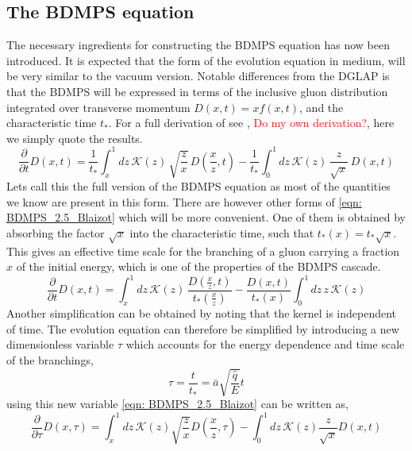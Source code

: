 \documentclass[main.tex]{subfiles}
\begin{document}
\subsection{The BDMPS equation}\label{sec: BDMPS_theory}
The necessary ingredients for constructing the BDMPS equation has now been introduced. It is expected that the form of the evolution equation in medium, will be very similar to the vacuum version. Notable differences from the DGLAP is that the BDMPS will be expressed in terms of the inclusive gluon distribution integrated over transverse momentum \(D(x,t) = x f(x,t)\), and the characteristic time \(t_*\). For a full derivation of see \cite{Probabilistic_picture_for_medium-induced_jet_evolution}, \textcolor{red}{Do my own derivation?}, here we simply quote the results. 
\begin{equation}\label{eqn: BDMPS_2.5_Blaizot}
    \frac{\partial}{\partial t} D(x,t) = \frac{1}{t_*} \int_x^1 dz\, \mathcal{K}(z)\, \sqrt{\frac{z}{x}}\, D\left(\frac{x}{z}, t\right) -\frac{1}{t_*} \int_0^1 dz\, \mathcal{K}(z)\, \frac{z}{\sqrt{x}}\, D\left(x,t\right)
\end{equation}
Lets call this the full version of the BDMPS equation as most of the quantities we know are present in this form. 
There are however other forms of \autoref{eqn: BDMPS_2.5_Blaizot} which will be more convenient. One of them is obtained by absorbing the factor \(\sqrt{x}\) into the characteristic time, such that \(t_*(x) = t_* \sqrt{x}\). This gives an effective time scale for the branching of a gluon carrying a fraction \(x\) of the initial energy, which is one of the properties of the BDMPS cascade.
\begin{equation}\label{eqn: BDMPS_2.8_Blaizot}
    \frac{\partial}{\partial t} D(x,t) = \int_x^1 dz\, \mathcal{K}(z)\, \frac{D\left(\frac{x}{z}, t\right)}{t_*(\frac{x}{z})} - \frac{D\left(x,t\right)}{t_*(x)} \int_0^1 dz\, z\, \mathcal{K}(z)
\end{equation}
Another simplification can be obtained by noting that the kernel is independent of time. The evolution equation can therefore be simplified by introducing a new dimensionless variable \(\tau\) which accounts for the energy dependence and time scale of the branchings, 
\begin{equation}\label{eqn: medium_tau_definiton}
    \tau = \frac{t}{t_*}= \bar a \sqrt{\frac{\hat{q}}{E}} t
\end{equation}
using this new variable \autoref{eqn: BDMPS_2.5_Blaizot} can be written as, 
\begin{equation}\label{eqn: BDMPS_solution_startingpoint}
    \frac{\partial}{\partial \tau} D(x, \tau) = \int_x^1 dz \,\mathcal{K}(z) \sqrt{\frac{z}{x}} D(\frac{x}{z}, \tau) - \int_0^1 dz \,\mathcal{K}(z) \frac{z}{\sqrt{x}} D(x,t)
\end{equation}
\end{document}
